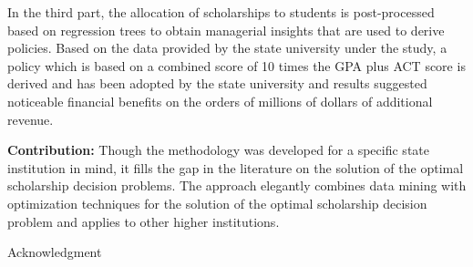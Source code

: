 \documentclass[12pt,english]{report}
\begin{document}
In the third part, the allocation of scholarships to students is post-processed based on regression trees to obtain managerial insights that are used to derive policies.  Based on the data provided  by the state university under the study, a policy which is based on a combined score of 10 times the
GPA plus ACT score is derived and has been adopted by the state university and
results suggested noticeable financial benefits on the orders of millions
of dollars of additional revenue.

\vspace*{.15in} %
\noindent \textbf{Contribution:} Though the methodology was developed for a specific state institution in mind, it fills the gap in the literature on the solution of the optimal scholarship decision problems.  The approach elegantly
combines data mining with optimization techniques for the solution of the optimal scholarship decision problem and applies to other higher
institutions.

\newpage 

\begin{doublespace}
	\tableofcontents
	\listoffigures
	\listoftables
\end{doublespace}
%
\newpage
\thispagestyle{plain}
\setlength{\parindent}{0em}
\begin{center}
	{\huge Acknowledgment}
\end{center}
\end{document}
